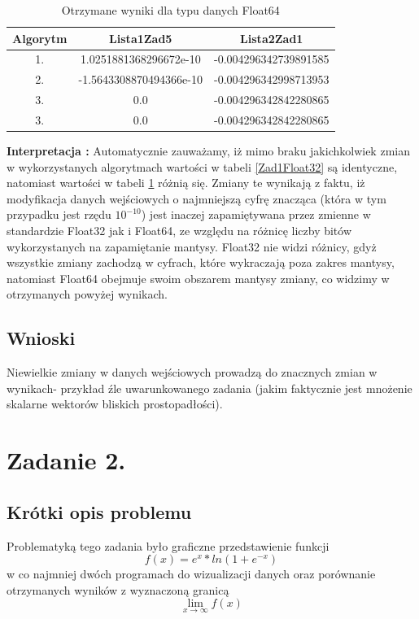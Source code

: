 \documentclass[a4paper,14pt]{report}
\begin{document}
    \begin{table}[h!]
    \centering
    \begin{tabular}{|c | c | c |} 
     \hline
     Algorytm & Lista1Zad5 & Lista2Zad1 \\ [0.5ex] 
     \hline\hline
     1.& 1.0251881368296672e-10 & -0.004296342739891585 \\ 
     2. & -1.5643308870494366e-10 & -0.004296342998713953 \\
     3. & 0.0 & -0.004296342842280865 \\
     3. & 0.0 & -0.004296342842280865 \\
     \hline
    \end{tabular}
    \caption{Otrzymane wyniki dla typu danych Float64}
    \label{Zad1Float64}
    \end{table}
    \textbf{Interpretacja :} Automatycznie zauważamy, iż mimo braku jakichkolwiek zmian w wykorzystanych algorytmach wartości w tabeli \ref{Zad1Float32} są identyczne, natomiast wartości w tabeli \ref{Zad1Float64} różnią się. Zmiany te wynikają z faktu, iż modyfikacja danych wejściowych o najmniejszą cyfrę znacząca (która w tym przypadku jest rzędu $10^{-10} $) jest inaczej zapamiętywana przez zmienne w standardzie Float32 jak i Float64, ze względu na różnicę liczby bitów wykorzystanych na zapamiętanie mantysy. Float32 nie widzi różnicy, gdyż wszystkie zmiany zachodzą w cyfrach, które wykraczają poza zakres mantysy, natomiast Float64 obejmuje swoim obszarem mantysy zmiany, co widzimy w otrzymanych powyżej wynikach.
  \section{Wnioski}
    Niewielkie zmiany w danych wejściowych prowadzą do znacznych zmian w wynikach- przykład źle uwarunkowanego zadania (jakim faktycznie jest mnożenie skalarne wektorów bliskich prostopadłości).

\chapter{Zadanie 2.}
  \section{Krótki opis problemu}
    Problematyką tego zadania było graficzne przedstawienie funkcji
    \begin{equation}
      f(x)=e^{x}*ln(1+e^{-x})
    \end{equation}
    w co najmniej dwóch programach do wizualizacji danych oraz porównanie otrzymanych wyników z wyznaczoną granicą
    \begin{equation}
      \lim_{x\to\infty} f(x)
    \end{equation}
\end{document}
